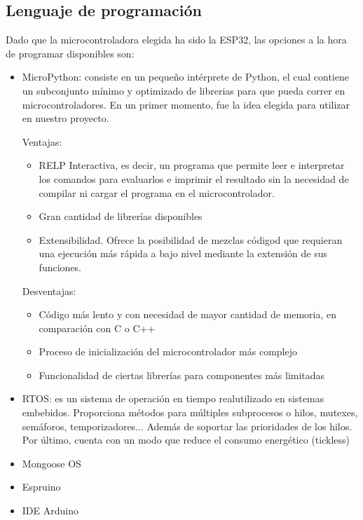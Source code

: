 \documentclass[runningheads]{llncs}
\begin{document}
\subsection*{Lenguaje de programación}

Dado que la microcontroladora elegida ha sido la ESP32, las opciones a la hora de programar disponibles son:

\begin{itemize}
    \item MicroPython: consiste en un pequeño intérprete de Python, el cual contiene un subconjunto mínimo y optimizado de librerias para que pueda correr en microcontroladores.
    En un primer momento, fue la idea elegida para utilizar en nuestro proyecto.
    
    Ventajas:
    \begin{itemize}
        \item RELP Interactiva, es decir, un programa que permite leer e interpretar los comandos para evaluarlos e imprimir el resultado sin la necesidad de compilar ni cargar el programa en el microcontrolador.
        \item Gran cantidad de librerías disponibles
        \item Extensibilidad. Ofrece la posibilidad de mezclas códigod que requieran una ejecución más rápida a bajo nivel mediante la extensión de sus funciones.
    \end{itemize}
    
    Desventajas:
    \begin{itemize}
        \item Código más lento y con necesidad de mayor cantidad de memoria, en comparación con C o C++
        \item Proceso de inicialización del microcontrolador más complejo
        \item Funcionalidad de ciertas librerías para componentes más limitadas
    \end{itemize}
     
    \item RTOS: es un sistema de operación en tiempo realutilizado en sistemas embebidos. Proporciona métodos para múltiples subprocesos o hilos, mutexes, semáforos, temporizadores... Además de soportar las prioridades de los hilos. Por último, cuenta con un modo que reduce el consumo energético (tickless)
    \item Mongoose OS
    \item Espruino
    \item IDE Arduino
\end{itemize}
\end{document}
